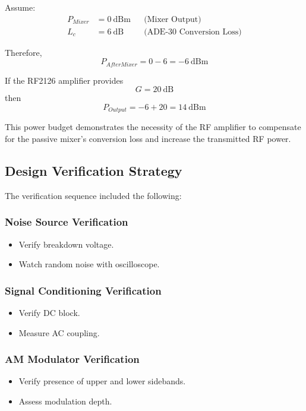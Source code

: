 \documentclass[12pt,a4paper]{report}
\begin{document}
	Assume:
	\begin{align*}
		P_{Mixer} &= 0\ \text{dBm} && \text{(Mixer Output)} \\
		L_c &= 6\ \text{dB} && \text{(ADE-30 Conversion Loss)}
	\end{align*}
	
	Therefore,
	\begin{equation}
		P_{AfterMixer} = 0 - 6 = -6\ \text{dBm}
	\end{equation}
	
	If the RF2126 amplifier provides
	\begin{equation}
		G = 20\ \text{dB}
	\end{equation}
	then
	\begin{equation}
		P_{Output} = -6 + 20 = 14\ \text{dBm}
	\end{equation}
	
	This power budget demonstrates the necessity of the RF amplifier to compensate for the passive mixer's conversion loss and increase the transmitted RF power.
	\subsection{Design Verification Strategy}
	
	The verification sequence included the following:
	
	\subsubsection{Noise Source Verification}
	\begin{itemize}
		\item Verify breakdown voltage.
		\item Watch random noise with oscilloscope.
	\end{itemize}
	
	\subsubsection{Signal Conditioning Verification}
	\begin{itemize}
		\item Verify DC block.
		\item Measure AC coupling.
	\end{itemize}
	
	\subsubsection{AM Modulator Verification}
	\begin{itemize}
		\item Verify presence of upper and lower sidebands.
		\item Assess modulation depth.
	\end{itemize}
	
\end{document}
